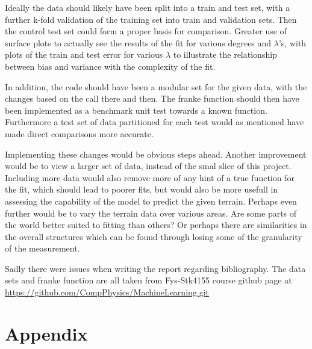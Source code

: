\documentclass[ 12pt, a4paper ]{article}
\begin{document}
Ideally the data should likely have been split into a train and test 
set, with a further k-fold validation of the training set into train and validation sets. Then
the control test set could form a proper basis for comparison. Greater use of surface plots to 
actually see the results of the fit for various degrees and $\lambda$'s, with plots of the train
and test error for various $\lambda$ to illustrate the relationship between bias and variance 
with the complexity of the fit. 

In addition, the code should have been a modular set for the given data, with the changes based
on the call there and then. The franke function should then have been implemented as a benchmark
unit test towards a known function. Furthermore a test set of data partitioned for each test 
would as mentioned have made direct comparisons more accurate. 

Implementing these changes would be obvious steps ahead. Another improvement would be to view 
a larger set of data, instead of the smal slice of this project. Including more data would also 
remove more of any hint of a true function for the fit, which should lead to poorer fits, but 
would also be more usefull in assessing the capability of the model to predict the given terrain.
Perhaps even further would be to vary the terrain data over various areas. Are some parts of the
world better suited to fitting than others? Or perhaps there are similarities in the overall
structures which can be found through losing some of the granularity of the measurement.

Sadly there were issues when writing the report regarding bibliography. The data sets and franke 
function are all taken from Fys-Stk4155 course github page at 
\url{https://github.com/CompPhysics/MachineLearning.git}

\section{Appendix}
\end{document}
